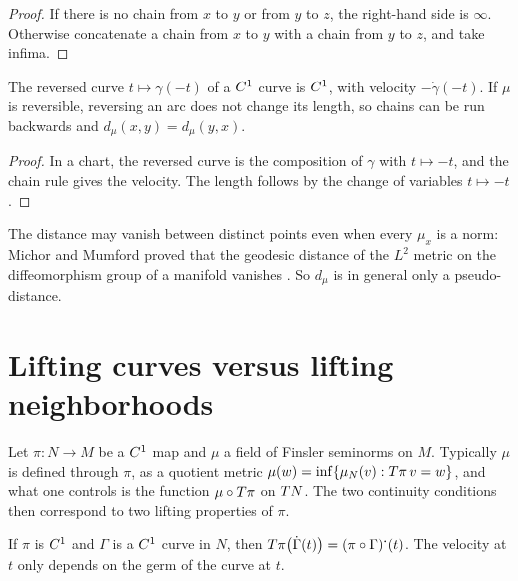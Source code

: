 \begin{proof}
  \leanok
  If there is no chain from $x$ to $y$ or from $y$ to $z$, the right-hand side is $\infty$.
  Otherwise concatenate a chain from $x$ to $y$ with a chain from $y$ to $z$, and take infima.
\end{proof}

\begin{proposition}
  \label{prop:mt-dist-comm}
  \leanok
  The reversed curve $t \mapsto \gamma(-t)$ of a $C^{1}$ curve is $C^{1}$, with velocity
  $-\dot\gamma(-t)$. If $\mu$ is reversible, reversing an arc does not change its length, so
  chains can be run backwards and $d_\mu(x, y) = d_\mu(y, x)$.
\end{proposition}

\begin{proof}
  \leanok
  In a chart, the reversed curve is the composition of $\gamma$ with $t \mapsto -t$, and the
  chain rule gives the velocity. The length follows by the change of variables $t \mapsto -t$.
\end{proof}

\begin{remark}
  The distance may vanish between distinct points even when every $\mu_x$ is a norm: Michor and
  Mumford proved that the geodesic distance of the $L^2$ metric on the diffeomorphism group of a
  manifold vanishes \cite[Thm.~5.2]{MM05}. So $d_\mu$ is in general only a pseudo-distance.
\end{remark}

\section{Lifting curves versus lifting neighborhoods}
\label{sec:mt-quotients}

Let $\pi \colon N \to M$ be a $C^{1}$ map and $\mu$ a field of Finsler seminorms on $M$. Typically
$\mu$ is defined through $\pi$, as a quotient metric $\mu(w) = \inf\{\mu_N(v) : T\pi\, v = w\}$, and
what one controls is the function $\mu \circ T\pi$ on $T N$. The two continuity conditions then
correspond to two lifting properties of $\pi$.

\begin{lemma}
  \label{lem:mt-chain}
  \leanok
  If $\pi$ is $C^{1}$ and $\Gamma$ is a $C^{1}$ curve in $N$, then
  $T\pi\bigl(\dot\Gamma(t)\bigr) = (\pi \circ \Gamma)^{\boldsymbol\cdot}(t)$. The velocity at $t$
  only depends on the germ of the curve at $t$.
\end{lemma}

